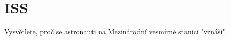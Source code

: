 \documentclass[crop=false]{standalone}
\begin{document}
\section*{ISS}
Vysvětlete, proč se astronauti na Mezinárodní vesmírné stanici "vznáší".
\end{document}
